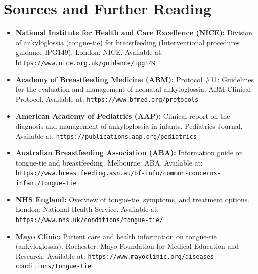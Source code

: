 \section*{Sources and Further Reading}
\begin{itemize}
  \item \textbf{National Institute for Health and Care Excellence (NICE):} Division of ankyloglossia (tongue-tie) for breastfeeding (Interventional procedures guidance IPG149). London: NICE. Available at: \texttt{https://www.nice.org.uk/guidance/ipg149}
  \item \textbf{Academy of Breastfeeding Medicine (ABM):} Protocol \#11: Guidelines for the evaluation and management of neonatal ankyloglossia. ABM Clinical Protocol. Available at: \texttt{https://www.bfmed.org/protocols}
  \item \textbf{American Academy of Pediatrics (AAP):} Clinical report on the diagnosis and management of ankyloglossia in infants. Pediatrics Journal. Available at: \texttt{https://publications.aap.org/pediatrics}
  \item \textbf{Australian Breastfeeding Association (ABA):} Information guide on tongue-tie and breastfeeding. Melbourne: ABA. Available at: \texttt{https://www.breastfeeding.asn.au/bf-info/common-concerns-infant/tongue-tie}
  \item \textbf{NHS England:} Overview of tongue-tie, symptoms, and treatment options. London: National Health Service. Available at: \texttt{https://www.nhs.uk/conditions/tongue-tie/}
  \item \textbf{Mayo Clinic:} Patient care and health information on tongue-tie (ankyloglossia). Rochester: Mayo Foundation for Medical Education and Research. Available at: \texttt{https://www.mayoclinic.org/diseases-conditions/tongue-tie}
\end{itemize}
